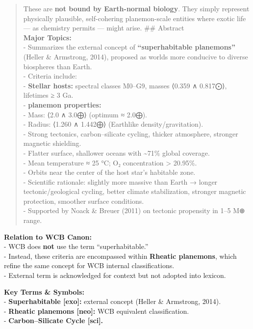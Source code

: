 \documentclass[
  letterpaper,
]{book}
\begin{document}
\begin{quote}
These are \textbf{not bound by Earth-normal biology}. They simply
represent physically plausible, self-cohering planemon-scale entities
where exotic life --- as chemistry permits --- might arise. \#\#
Abstract\\
\textbf{Major Topics:}\\
- Summarizes the external concept of \textbf{``superhabitable
planemons''} (Heller \& Armstrong, 2014), proposed as worlds more
conducive to diverse biospheres than Earth.\\
- Criteria include:\\
- \textbf{Stellar hosts:} spectral classes M0--G9, masses ⟨0.359 ∧
0.817⨀⟩, lifetimes ≥ 3 Ga.\\
- \textbf{planemon properties:}\\
- Mass: ⟨2.0 ∧ 3.0⨁⟩ (optimum ≈ 2.0⨁).\\
- Radius: ⟨1.260 ∧ 1.442⨁⟩ (Earthlike density/gravitation).\\
- Strong tectonics, carbon--silicate cycling, thicker atmosphere,
stronger magnetic shielding.\\
- Flatter surface, shallower oceans with \textasciitilde71\% global
coverage.\\
- Mean temperature ≈ 25 °C; O₂ concentration \textgreater{} 20.95\%.\\
- Orbits near the center of the host star's habitable zone.\\
- Scientific rationale: slightly more massive than Earth → longer
tectonic/geological cycling, better climate stabilization, stronger
magnetic protection, smoother surface conditions.\\
- Supported by Noack \& Breuer (2011) on tectonic propensity in 1--5 M⊕
range.
\end{quote}

\textbf{Relation to WCB Canon:}\\
- WCB does \textbf{not} use the term ``superhabitable.''\\
- Instead, these criteria are encompassed within \textbf{Rheatic
planemons}, which refine the same concept for WCB internal
classifications.\\
- External term is acknowledged for context but not adopted into
lexicon.

\textbf{Key Terms \& Symbols:}\\
- \textbf{Superhabitable {[}exo{]}:} external concept (Heller \&
Armstrong, 2014).\\
- \textbf{Rheatic planemons {[}neo{]}:} WCB equivalent classification.\\
- \textbf{Carbon--Silicate Cycle {[}sci{]}.}
\end{document}
